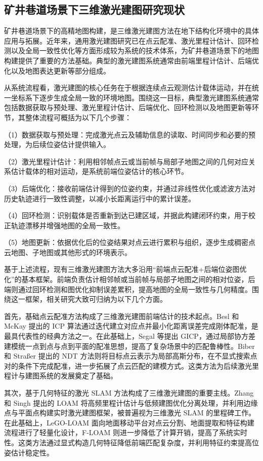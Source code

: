 \subsection{矿井巷道场景下三维激光建图研究现状}

矿井巷道场景下的高精地图构建，是三维激光建图方法在地下结构化环境中的具体应用与拓展。近年来，通用激光建图研究已在点云配准、激光里程计估计、回环检测以及全局一致性优化等方面形成较为系统的技术体系，为矿井巷道场景下的地图构建提供了重要的方法基础。典型的激光建图系统通常由前端里程计估计、后端优化以及地图表达更新等部分组成。

从系统流程看，激光建图的核心任务在于根据连续点云观测估计载体运动，并在统一坐标系下逐步生成全局一致的环境地图。围绕这一目标，典型激光建图系统通常包括数据获取与预处理、激光里程计估计、后端优化、回环检测以及地图更新等环节，其整体流程可概括为以下几个步骤：

（1）数据获取与预处理：完成激光点云及辅助信息的读取、时间同步和必要的预处理，为后续位姿估计提供输入。

（2）激光里程计估计：利用相邻帧点云或当前帧与局部子地图之间的几何对应关系估计载体的相对运动，是系统前端位姿估计的核心环节。

（3）后端优化：接收前端估计得到的位姿约束，并通过非线性优化或滤波方法对历史轨迹进行一致性调整，以减小长距离运行中的累计误差。

（4）回环检测：识别载体是否重新到达已建区域，并据此构建闭环约束，用于校正轨迹漂移并增强地图的全局一致性。

（5）地图更新：依据优化后的位姿结果对点云进行累积与组织，逐步生成稠密点云地图、子地图或其他形式的环境表示。

基于上述流程，现有三维激光建图方法大多沿用“前端点云配准+后端位姿图优化”的基本框架。前端负责估计相邻帧或当前帧与局部子地图之间的相对位姿，后端则通过回环检测和图优化抑制误差累积，提高地图的全局一致性与几何精度。围绕这一框架，相关研究大致可归纳为以下几个方面。

首先，基础点云配准方法构成了三维激光建图前端估计的技术起点。Besl 和 McKay 提出的 ICP 算法通过迭代建立对应点并最小化距离误差完成刚体配准，是最具代表性的经典方法之一\cite{Besl1992ICP}。在此基础上，Segal 等提出 GICP，通过局部协方差建模统一点到点与点到平面的配准思想，提高了复杂场景中的匹配鲁棒性\cite{Segal2009GICP}。Biber 和 Stra{\ss}er 提出的 NDT 方法则将目标点云表示为局部高斯分布，在不显式搜索点对的条件下完成配准，进一步拓展了点云匹配的建模方式\cite{Biber2003NDT}。这类方法为后续激光里程计与建图系统的发展奠定了基础。

其次，基于几何特征的激光 SLAM 方法构成了三维激光建图的重要主线。Zhang 和 Singh 提出的 LOAM 将高频里程计估计与低频建图优化分离处理，并利用边缘点与平面点构建实时激光建图框架，被普遍视为三维激光 SLAM 的里程碑工作\cite{Zhang2014LOAM}。在此基础上，LeGO-LOAM 面向地面移动平台对点云分割、地面提取和特征构建流程进行了轻量化设计\cite{Shan2018LeGOLOAM}，F-LOAM 则进一步降低了计算开销，提高了系统实时性\cite{Wang2021FLOAM}。这类方法通过显式构造几何特征降低前端匹配复杂度，并利用特征约束提高位姿估计稳定性。

